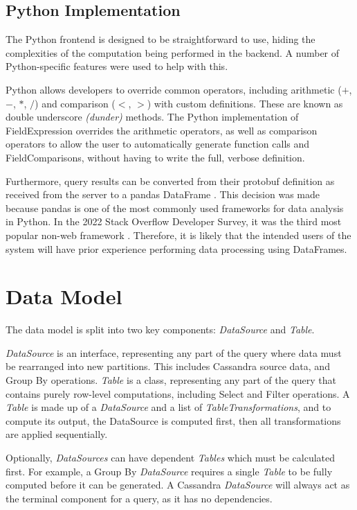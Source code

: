 \subsection{Python Implementation}
The Python frontend is designed to be straightforward to use, hiding the complexities of the computation being performed in the backend. A number of Python-specific features were used to help with this.

Python allows developers to override common operators, including arithmetic ($+$, $-$, $*$, $/$) and comparison ($<$, $>$) with custom definitions. These are known as double underscore \textit{(dunder)} methods. The Python implementation of FieldExpression overrides the arithmetic operators, as well as comparison operators to allow the user to automatically generate function calls and FieldComparisons, without having to write the full, verbose definition.

Furthermore, query results can be converted from their protobuf definition as received from the server to a pandas DataFrame \cite{reback2020pandas}. This decision was made because pandas is one of the most commonly used frameworks for data analysis in Python. In the 2022 Stack Overflow Developer Survey, it was the third most popular non-web framework \cite{stackoverflowsurvey2022}. Therefore, it is likely that the intended users of the system will have prior experience performing data processing using DataFrames.



\section{Data Model}\label{subsec:data-model}
The data model is split into two key components: \textit{DataSource} and \textit{Table}. 

\textit{DataSource} is an interface, representing any part of the query where data must be rearranged into new partitions. This includes Cassandra source data, and Group By operations. \textit{Table} is a class, representing any part of the query that contains purely row-level computations, including Select and Filter operations. A \textit{Table} is made up of a \textit{DataSource} and a list of \textit{TableTransformations}, and to compute its output, the DataSource is computed first, then all transformations are applied sequentially.

Optionally, \textit{DataSources} can have dependent \textit{Tables} which must be calculated first. For example, a Group By \textit{DataSource} requires a single \textit{Table} to be fully computed before it can be generated. A Cassandra \textit{DataSource} will always act as the terminal component for a query, as it has no dependencies.

